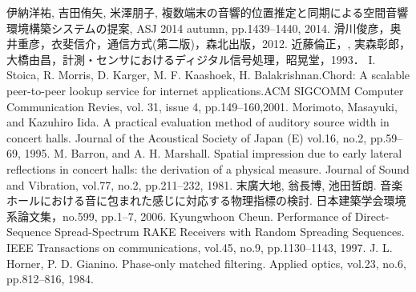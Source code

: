 \begin{thebibliography}{99}
伊納洋祐, 吉田侑矢, 米澤朋子,	複数端末の音響的位置推定と同期による空間音響環境構築システムの提案,	ASJ 2014 autumn,	pp.1439--1440,	2014.
滑川俊彦，奥井重彦，衣斐信介，通信方式(第二版)，森北出版，2012.
近藤倫正，, 実森彰郎，大橋由昌，計測・センサにおけるディジタル信号処理，昭晃堂，1993．
I. Stoica, R. Morris, D. Karger, M. F. Kaashoek, H. Balakrishnan.Chord: A scalable peer-to-peer lookup service for internet applications.ACM SIGCOMM Computer Communication Revies, vol. 31, issue 4, pp.149--160,2001.
Morimoto, Masayuki, and Kazuhiro Iida. A practical evaluation method of auditory source width in concert halls. Journal of the Acoustical Society of Japan (E) vol.16, no.2, pp.59--69, 1995.
M. Barron, and A. H. Marshall. Spatial impression due to early lateral reflections in concert halls: the derivation of a physical measure. Journal of Sound and Vibration, vol.77, no.2, pp.211--232, 1981.
末廣大地, 翁長博, 池田哲朗. 音楽ホールにおける音に包まれた感じに対応する物理指標の検討. 日本建築学会環境系論文集，no.599, pp.1--7, 2006.
Kyungwhoon Cheun. Performance of Direct-Sequence Spread-Spectrum RAKE Receivers with Random Spreading Sequences.
IEEE Transactions on communications, vol.45, no.9, pp.1130--1143, 1997.
J. L. Horner, P. D. Gianino. Phase-only matched filtering. Applied optics, vol.23, no.6, pp.812--816, 1984.


\end{thebibliography}
